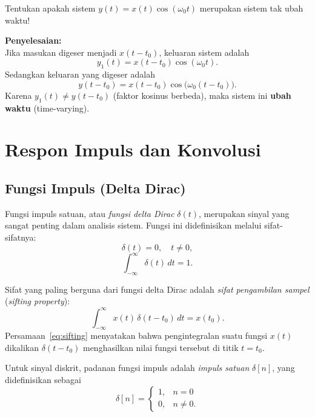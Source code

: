 \begin{exmp}
Tentukan apakah sistem $y(t) = x(t)\cos(\omega_0 t)$ merupakan sistem tak ubah waktu!

\textbf{Penyelesaian:}\\
Jika masukan digeser menjadi $x(t-t_0)$, keluaran sistem adalah
\[
y_1(t) = x(t-t_0)\cos(\omega_0 t).
\]
Sedangkan keluaran yang digeser adalah
\[
y(t-t_0) = x(t-t_0)\cos\bigl(\omega_0(t-t_0)\bigr).
\]
Karena $y_1(t) \ne y(t-t_0)$ (faktor kosinus berbeda), maka sistem ini \textbf{ubah waktu} (time-varying).
\end{exmp}

\section{Respon Impuls dan Konvolusi}

\subsection{Fungsi Impuls (Delta Dirac)}

Fungsi impuls satuan, atau \textit{fungsi delta Dirac} $\delta(t)$, merupakan sinyal yang sangat penting dalam analisis sistem. Fungsi ini didefinisikan melalui sifat-sifatnya:
\begin{equation}
\delta(t) = 0, \quad t \ne 0,
\end{equation}
\begin{equation}
\int_{-\infty}^{\infty} \delta(t)\,dt = 1.
\end{equation}

Sifat yang paling berguna dari fungsi delta Dirac adalah \textit{sifat pengambilan sampel} (\textit{sifting property}):
\begin{equation}
\int_{-\infty}^{\infty} x(t)\,\delta(t - t_0)\,dt = x(t_0).
\label{eq:sifting}
\end{equation}
Persamaan~\ref{eq:sifting} menyatakan bahwa pengintegralan suatu fungsi $x(t)$ dikalikan $\delta(t-t_0)$ menghasilkan nilai fungsi tersebut di titik $t=t_0$.

Untuk sinyal diskrit, padanan fungsi impuls adalah \textit{impuls satuan} $\delta[n]$, yang didefinisikan sebagai
\begin{equation}
\delta[n] = \begin{cases} 1, & n = 0 \\ 0, & n \ne 0. \end{cases}
\end{equation}

